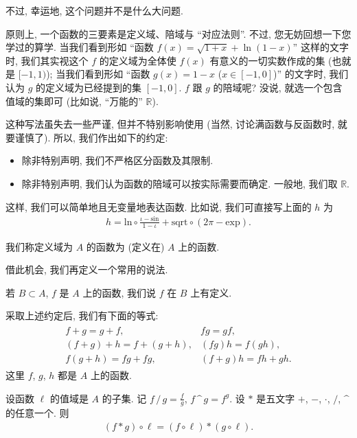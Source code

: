 不过, 幸运地, 这个问题并不是什么大问题.

原则上, 一个函数的三要素是定义域、陪域与 ``对应法则''. 不过, 您无妨回想一下您学过的算学. 当我们看到形如 ``函数 $f(x) = \sqrt{1 + x} + \operatorname{ln} {(1 - x)}$'' 这样的文字时, 我们其实视这个 $f$ 的定义域为全体使 $f(x)$ 有意义的一切实数作成的集 (也就是 $[-1, 1)$); 当我们看到形如 ``函数 $g(x) = 1 - x$ ($x \in [-1, 0]$)'' 的文字时, 我们认为 $g$ 的定义域为已经提到的集 $[-1, 0]$. $f$ 跟 $g$ 的陪域呢? 没说, 就选一个包含值域的集即可 (比如说, ``万能的'' $\mathbb{R}$).

这种写法虽失去一些严谨, 但并不特别影响使用 (当然, 讨论满函数与反函数时, 就要谨慎了). 所以, 我们作出如下的约定:
\begin{itemize}
    \item 除非特别声明, 我们不严格区分函数及其限制.
    \item 除非特别声明, 我们认为函数的陪域可以按实际需要而确定. 一般地, 我们取 $\mathbb{R}$.
\end{itemize}
这样, 我们可以简单地且无变量地表达函数. 比如说, 我们可直接写上面的 $h$ 为
\begin{align*}
    h = {\mathrm{ln}} \circ \frac{\iota - \mathrm{sin}}{1 - \iota} + \mathrm{sqrt} \circ (2\pi - \mathrm{exp}).
\end{align*}

\begin{definition}
    我们称定义域为 $A$ 的函数为 (定义在) $A$ 上的函数.
\end{definition}

借此机会, 我们再定义一个常用的说法.

\begin{definition}
    若 $B \subset A$, $f$ 是 $A$ 上的函数, 我们说 $f$ 在 $B$ 上有定义.
\end{definition}

采取上述约定后, 我们有下面的等式:
\begin{align*}
    \begin{array}{ll}
        f + g = g + f,             & fg = gf,            \\
        (f + g) + h = f + (g + h), & (fg)h = f(gh),      \\
        f(g + h) = fg + fg,        & (f + g)h = fh + gh.
    \end{array}
\end{align*}
这里 $f$, $g$, $h$ 都是 $A$ 上的函数.

设函数 $\ell$ 的值域是 $A$ 的子集. 记 $f \, / \, g = \frac{f}{g}$, $f \, \text{\textasciicircum} \, g = f^g$. 设 $\ast$ 是五文字 $+$, $-$, $\cdot$, $/$, $\text{\textasciicircum}$ 的任意一个. 则
\begin{align*}
    (f \ast g) \circ \ell = (f \circ \ell) \ast (g \circ \ell).
\end{align*}

